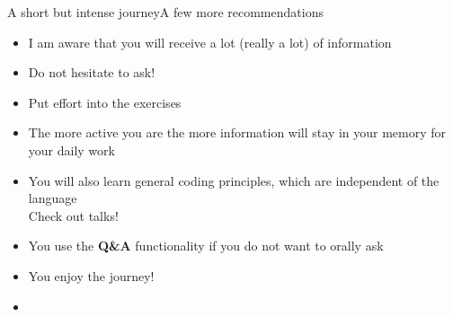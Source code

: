 \begin{frame}{A short but intense journey}{A few more recommendations}
    \begin{itemize}
        \item I am aware that you will receive a lot (really a lot) of information
        \item Do not hesitate to ask!
        \item Put effort into the exercises
        \item The more active you are the more information will stay in your memory for your daily work
    \end{itemize}
    \vspace{5mm}
    {\large{}}
    \begin{itemize}[<2->]
        \item You will also learn general coding principles, which are independent of the language \\
              {\small\then Check out   talks!}
        \item You use the \textbf{Q\&A} functionality if you do not want to orally ask
        \item You enjoy the journey! 
        \item {}
    \end{itemize}
\end{frame}
